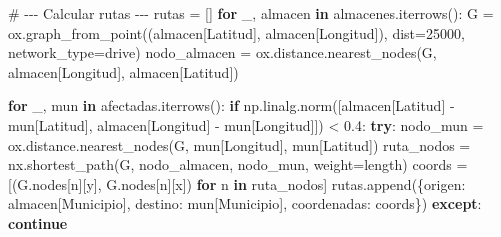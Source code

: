 \documentclass[
  spanish,
  us-letterpaper,
  DIV=11,
  numbers=noendperiod]{scrreprt}
\newenvironment{Shaded}{\begin{snugshade}}{\end{snugshade}}
\newcommand{\CommentTok}[1]{\textcolor[rgb]{0.37,0.37,0.37}{#1}}
\newcommand{\ControlFlowTok}[1]{\textcolor[rgb]{0.00,0.23,0.31}{\textbf{#1}}}
\newcommand{\DecValTok}[1]{\textcolor[rgb]{0.68,0.00,0.00}{#1}}
\newcommand{\FloatTok}[1]{\textcolor[rgb]{0.68,0.00,0.00}{#1}}
\newcommand{\KeywordTok}[1]{\textcolor[rgb]{0.00,0.23,0.31}{\textbf{#1}}}
\newcommand{\NormalTok}[1]{\textcolor[rgb]{0.00,0.23,0.31}{#1}}
\newcommand{\OperatorTok}[1]{\textcolor[rgb]{0.37,0.37,0.37}{#1}}
\newcommand{\StringTok}[1]{\textcolor[rgb]{0.13,0.47,0.30}{#1}}
\numberwithin{equation}{section}
\begin{document}
\begin{Shaded}
\begin{Highlighting}[]
\CommentTok{\# {-}{-}{-} Calcular rutas {-}{-}{-}}
\NormalTok{rutas }\OperatorTok{=}\NormalTok{ []}
\ControlFlowTok{for}\NormalTok{ \_, almacen }\KeywordTok{in}\NormalTok{ almacenes.iterrows():}
\NormalTok{    G }\OperatorTok{=}\NormalTok{ ox.graph\_from\_point((almacen[}\StringTok{\textquotesingle{}Latitud\textquotesingle{}}\NormalTok{], almacen[}\StringTok{\textquotesingle{}Longitud\textquotesingle{}}\NormalTok{]),}
\NormalTok{     dist}\OperatorTok{=}\DecValTok{25000}\NormalTok{, network\_type}\OperatorTok{=}\StringTok{\textquotesingle{}drive\textquotesingle{}}\NormalTok{)}
\NormalTok{    nodo\_almacen }\OperatorTok{=}\NormalTok{ ox.distance.nearest\_nodes(G, almacen[}\StringTok{\textquotesingle{}Longitud\textquotesingle{}}\NormalTok{],}
\NormalTok{     almacen[}\StringTok{\textquotesingle{}Latitud\textquotesingle{}}\NormalTok{])}

    \ControlFlowTok{for}\NormalTok{ \_, mun }\KeywordTok{in}\NormalTok{ afectadas.iterrows():}
        \ControlFlowTok{if}\NormalTok{ np.linalg.norm([almacen[}\StringTok{\textquotesingle{}Latitud\textquotesingle{}}\NormalTok{] }\OperatorTok{{-}}\NormalTok{ mun[}\StringTok{\textquotesingle{}Latitud\textquotesingle{}}\NormalTok{],}
\NormalTok{         almacen[}\StringTok{\textquotesingle{}Longitud\textquotesingle{}}\NormalTok{] }\OperatorTok{{-}}\NormalTok{ mun[}\StringTok{\textquotesingle{}Longitud\textquotesingle{}}\NormalTok{]]) }\OperatorTok{\textless{}} \FloatTok{0.4}\NormalTok{:}
            \ControlFlowTok{try}\NormalTok{:}
\NormalTok{                nodo\_mun }\OperatorTok{=}\NormalTok{ ox.distance.nearest\_nodes(G,}
\NormalTok{                 mun[}\StringTok{\textquotesingle{}Longitud\textquotesingle{}}\NormalTok{], mun[}\StringTok{\textquotesingle{}Latitud\textquotesingle{}}\NormalTok{])}
\NormalTok{                ruta\_nodos }\OperatorTok{=}\NormalTok{ nx.shortest\_path(G,}
\NormalTok{                 nodo\_almacen, nodo\_mun, weight}\OperatorTok{=}\StringTok{\textquotesingle{}length\textquotesingle{}}\NormalTok{)}
\NormalTok{                coords }\OperatorTok{=}\NormalTok{ [(G.nodes[n][}\StringTok{\textquotesingle{}y\textquotesingle{}}\NormalTok{],}
\NormalTok{                 G.nodes[n][}\StringTok{\textquotesingle{}x\textquotesingle{}}\NormalTok{]) }\ControlFlowTok{for}\NormalTok{ n }\KeywordTok{in}\NormalTok{ ruta\_nodos]}
\NormalTok{                rutas.append(\{}\StringTok{\textquotesingle{}origen\textquotesingle{}}\NormalTok{: almacen[}\StringTok{\textquotesingle{}Municipio\textquotesingle{}}\NormalTok{],}
                 \StringTok{\textquotesingle{}destino\textquotesingle{}}\NormalTok{: mun[}\StringTok{\textquotesingle{}Municipio\textquotesingle{}}\NormalTok{], }\StringTok{\textquotesingle{}coordenadas\textquotesingle{}}\NormalTok{: coords\})}
            \ControlFlowTok{except}\NormalTok{:}
                \ControlFlowTok{continue}


\end{Highlighting}
\end{Shaded}
\end{document}
